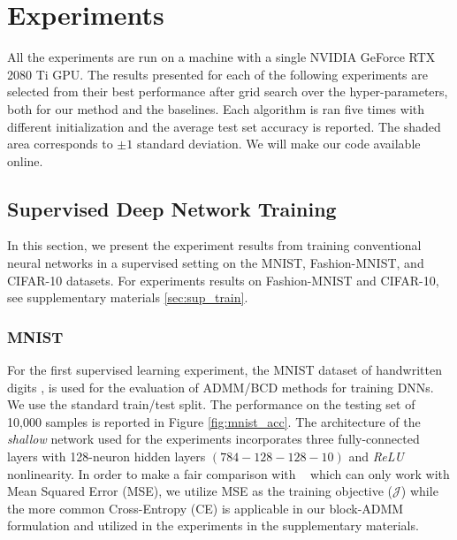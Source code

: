 \section{Experiments} \label{sec:exp}


All the experiments are run on a machine with a single NVIDIA GeForce RTX 2080 Ti GPU. The results presented for each of the following experiments are selected from their best performance after grid search over the hyper-parameters, both for our method and the baselines. %
Each algorithm is ran five times with different initialization and the average test set accuracy is reported. The shaded area corresponds to $\pm1$ standard deviation. We will make our code available online. %

\subsection{Supervised Deep Network Training}\label{exp:conv}
In this section, we present the experiment results from training conventional neural networks in a supervised setting on the MNIST, Fashion-MNIST, and CIFAR-10 datasets. For experiments results on Fashion-MNIST and CIFAR-10, see supplementary materials \ref{sec:sup_train}. %


\subsubsection{MNIST}\label{exp:mnist}
For the first supervised learning experiment, the MNIST dataset of handwritten digits \cite{mnist}, is used for the evaluation of ADMM/BCD methods for training DNNs. We use the standard train/test split. %
The performance on the testing set of 10,000 samples is reported in Figure \ref{fig:mnist_acc}. The architecture of the \emph{shallow} network used for the experiments incorporates three fully-connected layers with 128-neuron hidden layers $(784-128-128-10)$ and \emph{ReLU} nonlinearity. In order to make a fair comparison with ~\cite{taylor2016training} which can only work with Mean Squared Error (MSE), we utilize MSE as the training objective ($\mathcal{J}$) while the more common Cross-Entropy (CE) is applicable in our block-ADMM formulation and utilized in the experiments in the supplementary materials. 


